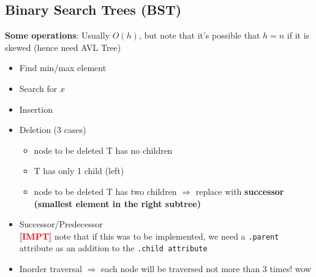 \documentclass{article}
\newcommand{\impt}[0]{\textcolor{red}{\textbf{[IMPT] }}}
\begin{document}
\begin{multicols}{2}
\subsection{Binary Search Trees (BST)}
\textbf{Some operations}: Usually $O(h)$, but note that it's possible that $h=n$ if it is skewed (hence need AVL Tree)
\begin{itemize}
	\item Find min/max element
	\item Search for $x$
	\item Insertion
	\item Deletion (3 cases)
	\begin{itemize}
		\item node to be deleted T has no children
		\item T has only 1 child (left)
		\item node to be deleted T has two children $\Rightarrow$ replace with \textbf{successor (smallest element in the right subtree)}
	\end{itemize}
    \item Successor/Predecessor\\
    \impt note that if this was to be implemented, we need a \texttt{.parent} attribute as an addition to the \texttt{.child attribute}
    \item Inorder traversal $\Rightarrow$ each node will be traversed not more than 3 times! wow
\end{itemize}


\end{multicols}
\end{document}
